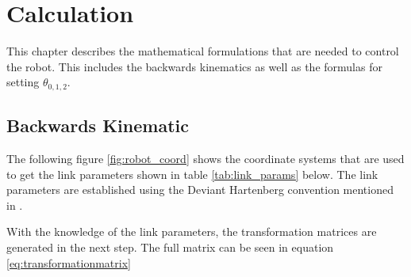 \documentclass[./\jobname.tex]{subfiles}
\begin{document}
\begin{figure}[H]
	\centering
	\noindent{}
	\label{fig:final_assemgly}
\end{figure}


\chapter{Calculation}
This chapter describes the mathematical formulations that are needed to control the robot. This includes the backwards kinematics as well as the formulas for setting $\theta_{0,1,2}$. 

\section{Backwards Kinematic}

The following figure \ref{fig:robot_coord} shows the coordinate systems that are used to get the link parameters shown in table \ref{tab:link_params} below. The link parameters are established using the Deviant Hartenberg convention mentioned in \cite[p. 70- 79]{Craig2018}.

With the knowledge of the link parameters, the transformation matrices are generated in the next step. The full matrix can be seen in equation \ref{eq:transformationmatrix}
\end{document}
